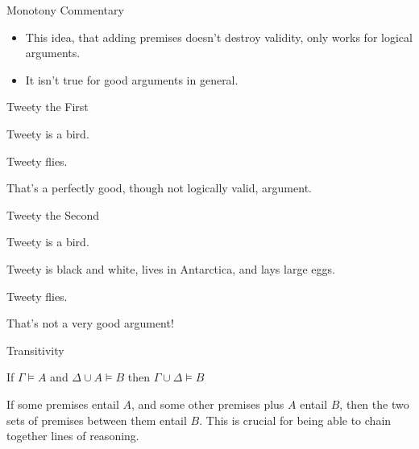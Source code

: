 \documentclass[
  ignorenonframetext,
]{beamer}
\providecommand{\tightlist}{%
  \setlength{\itemsep}{0pt}\setlength{\parskip}{0pt}}
\renewcommand{\,}{\text{, }}
\renewenvironment*{quote}	
	{\list{}{\rightmargin   \leftmargin} \item } 	
	{\endlist }
\newcommand{\DisplayArg}[2]{
\begin{enumerate}
{#1}
\end{enumerate}
\vspace{-6pt}
\hrulefill

\begin{quote}
{\normalfont #2}
\end{quote}
\vspace{12pt}
}
\begin{document}
\begin{frame}{Monotony Commentary}
\protect\hypertarget{monotony-commentary}{}

\begin{itemize}
\tightlist
\item
  This idea, that adding premises doesn't destroy validity, only works
  for logical arguments.
\item
  It isn't true for good arguments in general.
\end{itemize}

\end{frame}

\begin{frame}{Tweety the First}
\protect\hypertarget{tweety-the-first}{}

\DisplayArg{ \item Tweety is a bird. } { Tweety flies. } \bigskip

That's a perfectly good, though not logically valid, argument.

\end{frame}

\begin{frame}{Tweety the Second}
\protect\hypertarget{tweety-the-second}{}

\DisplayArg{ \item Tweety is a bird. \item Tweety is black and white, lives in Antarctica, and lays large eggs. } { Tweety flies. } \bigskip

That's not a very good argument!

\end{frame}

\begin{frame}{Transitivity}
\protect\hypertarget{transitivity}{}

\begin{quote}
If \(\Gamma \vDash A\) and \(\Delta \cup A \vDash B\) then
\(\Gamma \cup \Delta \vDash B\)
\end{quote}

If some premises entail \(A\), and some other premises plus \(A\) entail
\(B\), then the two sets of premises between them entail \(B\).
\pause This is crucial for being able to chain together lines of
reasoning.

\end{frame}
\end{document}
